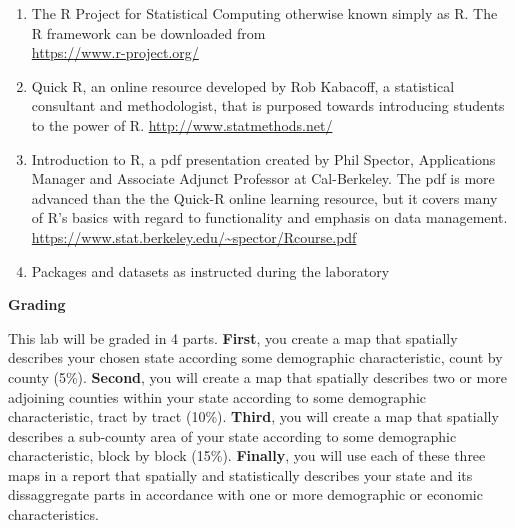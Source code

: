 \documentclass{article}
\begin{document}
\begin{enumerate}[leftmargin=15mm]

\item The R Project for Statistical Computing otherwise known simply as R.  The R framework can be downloaded from \\ 
\url{https://www.r-project.org/}

\item Quick R, an online resource developed by Rob Kabacoff, a statistical consultant and methodologist, that is purposed towards introducing students to the power of R.  
\url{http://www.statmethods.net/}

\item Introduction to R, a pdf presentation created by Phil Spector, Applications Manager and Associate Adjunct Professor at Cal-Berkeley.  The pdf is more advanced than the the Quick-R online learning resource, but it covers many of R's basics with regard to functionality and emphasis on data management. \\ 
\url{https://www.stat.berkeley.edu/~spector/Rcourse.pdf}




\item Packages and datasets as instructed during the laboratory

\end{enumerate}


\newpage

\textbf{Grading}

\vspace{4mm}

\setlength{\leftskip}{1cm}

\setlength{\parindent}{0cm}

This lab will be graded in 4 parts.  \textbf{First}, you create a map that spatially describes your chosen state according some demographic characteristic, count by county (5\%).  \textbf{Second}, you will create a map that spatially describes two or more adjoining counties within your state according to some demographic characteristic, tract by tract (10\%).  \textbf{Third}, you will create a map that spatially describes a sub-county area of your state according to some demographic characteristic, block by block (15\%).  \textbf{Finally}, you will use each of these three maps in a report that spatially and statistically describes your state and its dissaggregate parts in accordance with one or more demographic or economic characteristics.  \\
\end{document}
